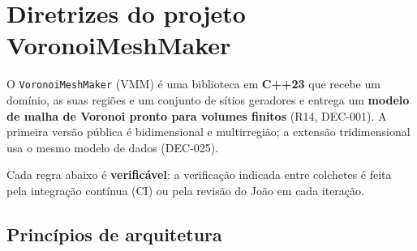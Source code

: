 
\section{Diretrizes do projeto VoronoiMeshMaker}
\label{sec:vmm_project_guidelines}

O \texttt{VoronoiMeshMaker} (VMM) é uma biblioteca em \textbf{C++23} que recebe um domínio, as suas regiões e um
conjunto de sítios geradores e entrega um \textbf{modelo de malha de Voronoi pronto para volumes finitos}
(R14, DEC-001). A primeira versão pública é bidimensional e multirregião; a extensão tridimensional usa o mesmo
modelo de dados (DEC-025).

Cada regra abaixo é \textbf{verificável}: a verificação indicada entre colchetes é feita pela integração
contínua (CI) ou pela revisão do João em cada iteração.

\subsection{Princípios de arquitetura}

